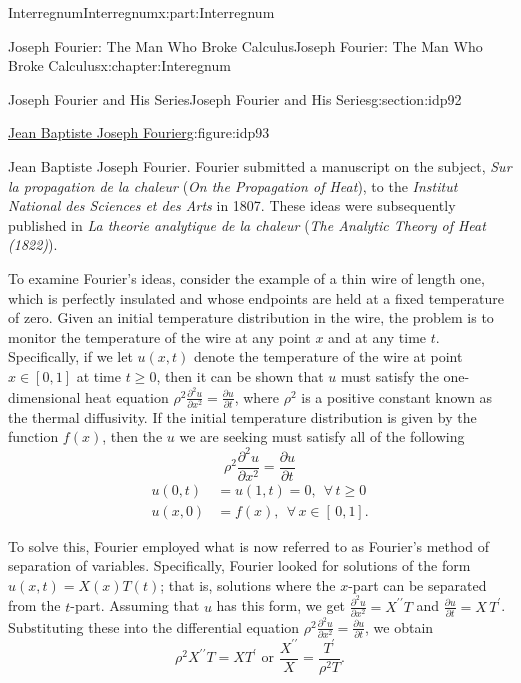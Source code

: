\documentclass[oneside,10pt,]{book}
\numberwithin{equation}{section}
\newcommand{\amp}{&}
\begin{document}
\begin{partptx}{Interregnum}{}{Interregnum}{}{}{x:part:Interregnum}
\begin{chapterptx}{Joseph Fourier: The Man Who Broke Calculus}{}{Joseph Fourier: The Man Who Broke Calculus}{}{}{x:chapter:Interegnum}
\begin{sectionptx}{Joseph Fourier and His Series}{}{Joseph Fourier and His Series}{}{}{g:section:idp92}
\begin{figureptx}{\href{https://mathshistory.st-andrews.ac.uk/Biographies/Fourier/}{Jean Baptiste Joseph Fourier}\protect\footnotemark{}}{g:figure:idp93}{}
\begin{image}{0.325}{0.35}{0.325}
\end{image}%
\tcblower
\end{figureptx}%
%
 Jean Baptiste Joseph Fourier.  Fourier submitted a manuscript on the subject, \textit{Sur la propagation de la chaleur} (\emph{On the Propagation of Heat}), to the \textit{Institut National des Sciences et des Arts} in 1807.  These ideas were subsequently published in \textit{La theorie analytique de la chaleur} (\emph{The Analytic Theory of Heat (1822)}).%
\par
To examine Fourier's ideas, consider the example of a thin wire of length one, which is perfectly insulated and whose endpoints are held at a fixed temperature of zero. Given an initial temperature distribution in the wire, the problem is to monitor the temperature of the wire at any point \(x\) and at any time \(t\). Specifically, if we let \(u(x,t)\) denote the temperature of the wire at point \(x\in[0,1]\) at time \(t\geq 0\), then it can be shown that \(u\) must satisfy the one-dimensional heat equation \(\rho^2\frac{\partial^2u}{\partial x^2}=\frac{\partial u}{\partial t}\), where \(\rho^2\) is a positive constant known as the thermal diffusivity. If the initial temperature distribution is given by the function \(f(x)\), then the \(u\) we are seeking must satisfy all of the following%
\begin{equation*}
\rho^2\frac{\partial^2u}{\partial x^2}=\frac{\partial u}{\partial t}
\end{equation*}
%
\begin{align*}
u(0,t)\amp =u(1,t)=0,\ \ \forall\,t\geq 0\\
u(x,0)\amp =f(x),\ \ \forall\,x\in[\,0,1]\text{.}
\end{align*}
%
\par
To solve this, Fourier employed what is now referred to as Fourier's method of separation of variables. Specifically, Fourier looked for solutions of the form \(u(x,t)=X(x)T(t)\); that is, solutions where the \(x\)-part can be separated from the \(t\)-part. Assuming that \(u\) has this form, we get \(\frac{\partial^2u}{\partial x^2}=X^{\prime\prime}T\) and \(\frac{\partial u}{\partial t}=X\,T^{\prime}\). Substituting these into the differential equation \(\rho^2\frac{\partial^2u}{\partial x^2}=\frac{\partial u}{\partial t}\), we obtain%
\begin{equation*}
\rho^2X^{\prime\prime}T=X T^\prime\text{  or  } \frac{X^{\prime\prime}}{X}=\frac{T^\prime}{\rho^2T}\text{.}

\end{equation*}
\end{sectionptx}
\end{chapterptx}
\end{partptx}
\end{document}
